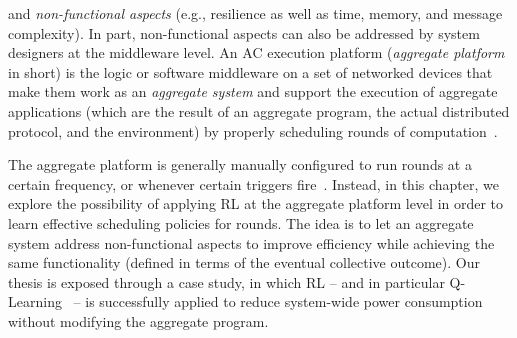  and \emph{non-functional aspects} (e.g., resilience as well as time, memory, and message complexity).
%
In part, non-functional aspects 
 can also be addressed by system designers
 at the middleware level.
%
An \ac{AC} execution platform (\emph{aggregate platform} in short) is the logic or software middleware 
 on a set of networked devices 
 that make them work as an \emph{aggregate system}
 and support the execution of aggregate applications (which are the result of an aggregate program, the actual distributed protocol, and the environment) by properly scheduling rounds of computation~\cite{DBLP:journals/fi/CasadeiPPVW20}. 

The aggregate platform is generally manually configured to run rounds at a certain frequency, or whenever certain triggers fire~\cite{danilo2021lmcs}.
%
Instead, in this chapter, 
 we explore the possibility of applying \ac{RL} at the aggregate platform level
 in order to learn effective scheduling policies for rounds.
%
The idea is to let an aggregate system
 address non-functional aspects  
 to improve efficiency %
 while 
 achieving the same functionality
 (defined in terms of the eventual collective outcome). 
%
Our thesis is exposed through a case study, in which \ac{RL} -- and in particular Q-Learning~\cite{DBLP:conf/icml/LauerR00} -- is successfully applied to reduce system-wide power consumption without modifying the aggregate program.   

%
%
%
%
